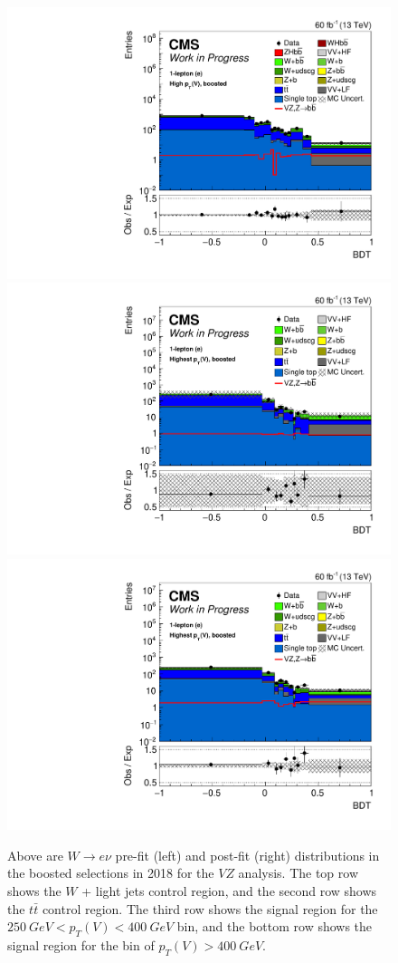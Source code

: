 \begin{figure}
  \includegraphics[width=0.35\linewidth]{figures/210414_STXS_VZ_unblinded_XbbVZ_e4179c95_postfitplots/plot_shapes_vhbb_Wen_22_13TeV2018_postfit_logy} \\
  \includegraphics[width=0.35\linewidth]{figures/210414_STXS_VZ_unblinded_XbbVZ_e4179c95_postfitplots/plot_shapes_vhbb_Wen_24_13TeV2018_prefit_logy}
  \includegraphics[width=0.35\linewidth]{figures/210414_STXS_VZ_unblinded_XbbVZ_e4179c95_postfitplots/plot_shapes_vhbb_Wen_24_13TeV2018_postfit_logy} \\
  \caption[$W\rightarrow e\nu$ $V\!Z$ distributions for the boosted selection in 2018]{
    Above are $W\rightarrow e\nu$ pre-fit (left) and post-fit (right) distributions in the boosted selections in 2018
    for the $V\!Z$ analysis.
    The top row shows the $W$ + light jets control region,
    and the second row shows the  $t\bar{t}$ control region.
    The third row shows the signal region for the $\SI{250}{GeV} < p_T(V) < \SI{400}{GeV}$ bin,
    and the bottom row shows the signal region for the bin of $p_T(V) > \SI{400}{GeV}$.
  }
  \label{fig:vz-wen-boost-2018}
\end{figure}

